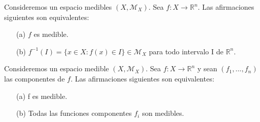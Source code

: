 \begin{prop}
    Consideremos un espacio medibles $(X, \mathcal{M}_X)$. Sea $f : X \longrightarrow \mathbb{R}^n$. Las afirmaciones siguientes son equivalentes:
    \begin{enumerate}
        \item[(a)] $f$ es medible.
        \item[(b)] $f^{-1}(I) = \{ x \in X : f(x) \in I\} \in \mathcal{M}_X$ para todo intervalo I de $\mathbb{R}^n$.
    \end{enumerate}
\end{prop}

\begin{prop}
    Consideremos un espacio medible $(X, \mathcal{M}_X)$. Sea $f : X \longrightarrow \mathbb{R}^n$ y sean $(f_1, ..., f_n)$ las componentes de  $f$. Las afirmaciones siguientes son equivalentes:
    \begin{enumerate}
        \item[(a)] f es medible.
        \item[(b)] Todas las funciones componentes $f_i$ son medibles.
    \end{enumerate}
\end{prop}

